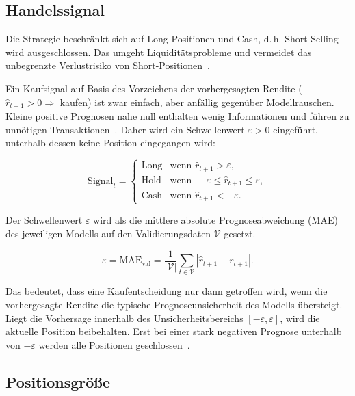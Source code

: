 \subsection{Handelssignal}\label{subsec:signal}

Die Strategie beschränkt sich auf Long-Positionen und Cash, d.\,h. Short-Selling wird ausgeschlossen. Das umgeht Liquiditätsprobleme und vermeidet das unbegrenzte Verlustrisiko von Short-Positionen~\cite{asness2015}.

Ein Kaufsignal auf Basis des Vorzeichens der vorhergesagten Rendite ($\hat{r}_{t+1} > 0 \Rightarrow$ kaufen) ist zwar einfach, aber anfällig gegenüber Modellrauschen. Kleine positive Prognosen nahe null enthalten wenig Informationen und führen zu unnötigen Transaktionen~\cite{avellaneda2010}. Daher wird ein Schwellenwert $\varepsilon > 0$ eingeführt, unterhalb dessen keine Position eingegangen wird:

\begin{equation}
    \text{Signal}_t =
    \begin{cases}
        \text{Long} & \text{wenn } \hat{r}_{t+1} > \varepsilon,                      \\
        \text{Hold} & \text{wenn } -\varepsilon \leq \hat{r}_{t+1} \leq \varepsilon, \\
        \text{Cash} & \text{wenn } \hat{r}_{t+1} < -\varepsilon.
    \end{cases}
\end{equation}

Der Schwellenwert $\varepsilon$ wird als die mittlere absolute Prognoseabweichung (\ac{MAE}) des jeweiligen Modells auf den Validierungsdaten $\mathcal{V}$ gesetzt.

\begin{equation}
    \varepsilon = \text{MAE}_{\text{val}} = \frac{1}{|\mathcal{V}|} \sum_{t \in \mathcal{V}} |\hat{r}_{t+1} - r_{t+1}|.
\end{equation}

Das bedeutet, dass eine Kaufentscheidung nur dann getroffen wird, wenn die vorhergesagte Rendite die typische Prognoseunsicherheit des Modells übersteigt. Liegt die Vorhersage innerhalb des Unsicherheitsbereichs $[-\varepsilon, \varepsilon]$, wird die aktuelle Position beibehalten. Erst bei einer stark negativen Prognose unterhalb von $-\varepsilon$ werden alle Positionen geschlossen~\cite{de2018advances}.

\subsection{Positionsgröße}\label{subsec:kelly}

